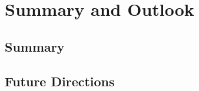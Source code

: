 \chapter{Summary and Outlook}
\label{chap:conclusion}

\section{Summary}


\section{Future Directions}


